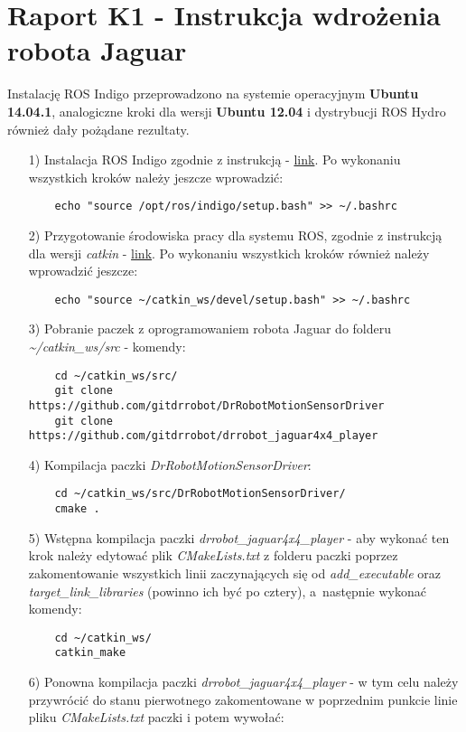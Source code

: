 \section{Raport K1 - Instrukcja wdrożenia robota Jaguar}
Instalację ROS Indigo przeprowadzono na systemie operacyjnym \textbf{Ubuntu 14.04.1}, analogiczne kroki dla wersji \textbf{Ubuntu 12.04} i dystrybucji ROS Hydro również dały pożądane rezultaty.
\begin{enumerate}
\item[1)] Instalacja ROS Indigo zgodnie z instrukcją - \href{http://wiki.ros.org/indigo/Installation/Ubuntu}{link}. Po wykonaniu wszystkich kroków należy jeszcze wprowadzić:
	\begin{verbatim}
 	echo "source /opt/ros/indigo/setup.bash" >> ~/.bashrc
 	\end{verbatim}
\item[2)] Przygotowanie środowiska pracy dla systemu ROS, zgodnie z instrukcją dla wersji \textit{catkin} - \href{http://wiki.ros.org/ROS/Tutorials/InstallingandConfiguringROSEnvironment}{link}. Po wykonaniu wszystkich kroków również należy wprowadzić jeszcze:
	\begin{verbatim}
	echo "source ~/catkin_ws/devel/setup.bash" >> ~/.bashrc
	\end{verbatim}
\item[3)] Pobranie paczek z oprogramowaniem robota Jaguar do folderu \textit{\textasciitilde/catkin\_ws/src} - komendy:
	\begin{verbatim}
	cd ~/catkin_ws/src/
	git clone https://github.com/gitdrrobot/DrRobotMotionSensorDriver
	git clone https://github.com/gitdrrobot/drrobot_jaguar4x4_player
	\end{verbatim}
\item[4)] Kompilacja paczki \textit{DrRobotMotionSensorDriver}:
	\begin{verbatim}
	cd ~/catkin_ws/src/DrRobotMotionSensorDriver/
	cmake .
 	\end{verbatim}
\item[5)] Wstępna kompilacja paczki \textit{drrobot\_jaguar4x4\_player} - aby wykonać ten krok należy edytować plik \textit{CMakeLists.txt} z folderu paczki poprzez zakomentowanie wszystkich linii zaczynających się od \textit{add\_executable} oraz \textit{target\_link\_libraries} (powinno ich być po cztery), a~następnie wykonać komendy:
	\begin{verbatim}
	cd ~/catkin_ws/
	catkin_make
	\end{verbatim}
\item[6)] Ponowna kompilacja paczki \textit{drrobot\_jaguar4x4\_player} - w tym celu należy przywrócić do stanu pierwotnego zakomentowane w poprzednim punkcie linie pliku \textit{CMakeLists.txt} paczki i potem wywołać:

\end{enumerate}
